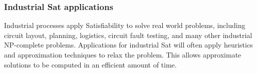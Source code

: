 \subsubsection{Industrial {\sc Sat} applications}

Industrial processes apply {\sc Satisfiability} to solve real world problems, including circuit layout, planning, logistics, circuit fault testing, and many other industrial \textsf{NP-complete} problems.  Applications for industrial {\sc Sat} will often apply heuristics and approximation techniques to relax the problem.  This allows approximate solutions to be computed in an efficient amount of time.
